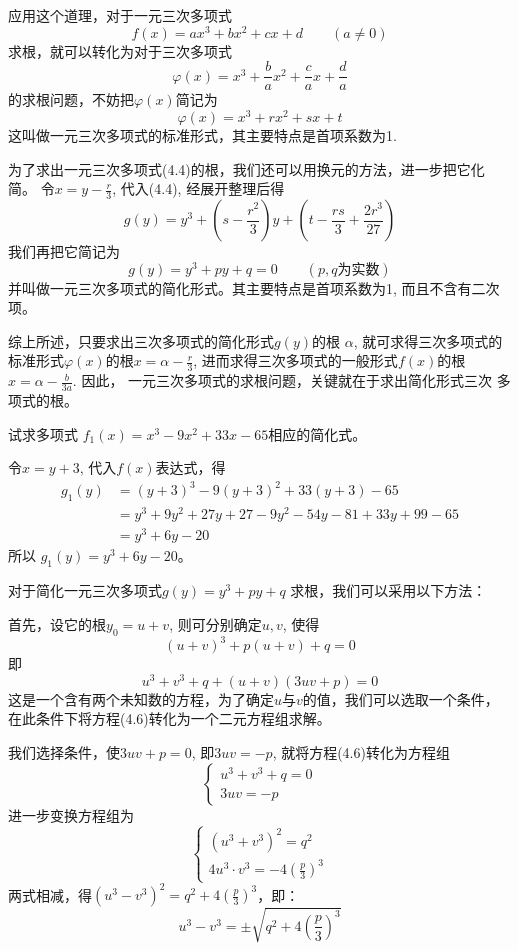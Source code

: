 应用这个道理，对于一元三次多项式
\begin{equation}
    f (x) =ax^3+bx^2+cx+d\qquad  (a\ne 0)
\end{equation}
求根，就可以转化为对于三次多项式
\[\varphi(x)=x^3+\frac{b}{a}x^2+\frac{c}{a}x+\frac{d}{a}\]
的求根问题，不妨把$\varphi(x)$简记为
\begin{equation}
    \varphi(x)=x^3+rx^2+sx+t
\end{equation}
这叫做一元三次多项式的标准形式，其主要特点是首项系数为1.

为了求出一元三次多项式(4.4)的根，我们还可以用换元的方法，进一步把它化简。
令$x=y-\frac{r}{3}$, 代入(4.4), 经展开整理后得
\[g(y) =y^3+ \left(s-\frac{r^2}{3}\right) y+ \left(t-\frac{rs}{3}+\frac{2r^3}{27}\right)\]
我们再把它简记为
\begin{equation}
    g(y)=y^3+py+q=0\qquad  (p,q\text{为实数})
\end{equation}
并叫做一元三次多项式的简化形式。其主要特点是首项系数为1, 而且不含有二次项。

综上所述，只要求出三次多项式的简化形式$g(y)$的根
$\alpha$, 就可求得三次多项式的标准形式$\varphi(x)$的根$x=\alpha-\frac{r}{3}$,
进而求得三次多项式的一般形式$f(x)$的根$x=\alpha-\frac{b}{3a}$. 因此，
一元三次多项式的求根问题，关键就在于求出简化形式三次
多项式的根。

\begin{example}
    试求多项式
$f_1 (x) =x^3-9x^2+33x-65$相应的简化式。
\end{example}


\begin{solution}
    令$x=y+3$, 代入$f(x)$表达式，得
\[\begin{split}
    g_1 (y) &= (y+3)^3-9 (y+3)^2+33 (y+3) -65\\
&=y^3+9y^2+27y+27-9y^2-54y-81+33y+99-65\\
&=y^3 +6y -20
\end{split}\]
所以
$g_1 (y) =y^3+6y-20$。
\end{solution}

对于简化一元三次多项式$g(y)=y^3+py+q$
求根，我们可以采用以下方法：

首先，设它的根$y_0=u+v$, 则可分别确定$u,v$, 使得
\begin{equation}
     (u+v)^3+p (u+v) +q=0
\end{equation}
即
\[u^3+v^3+q+ (u+v) (3uv+p)=0\]
这是一个含有两个未知数的方程，为了确定$u$与$v$的值，我们可以选取一个条件，在此条件下将方程(4.6)转化为一个二元方程组求解。

我们选择条件，使$3uv+p=0$, 即$3uv=-p$, 就将方程(4.6)转化为方程组
\[\begin{cases}
    u^3+v^3+q=0\\3uv=-p
\end{cases}\]
进一步变换方程组为
\[\begin{cases}
    (u^3+v^3)^2=q^2\\
    4u^3\cdot v^3=-4\left(\frac{p}{3}\right)^3
\end{cases}\]
两式相减，得$(u^3-v^3)^2=q^2+4\left(\frac{p}{3}\right)^3$，即：
\[u^3-v^3=\pm\sqrt{q^2+4\left(\frac{p}{3}\right)^3}\]

